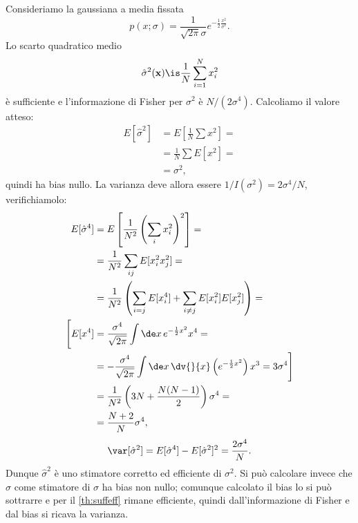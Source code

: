 \begin{example}
	Consideriamo la gaussiana a media fissata
	\begin{equation*}
		p(x;\sigma)
		= \frac1{\sqrt{2\pi}\sigma} e^{-\frac12 \frac{x^2}{\sigma^2}}.
	\end{equation*}
	Lo scarto quadratico medio
	\begin{equation*}
		\hat\sigma^2(\mathbf x)
		\is \frac1N \sum_{i=1}^N x_i^2
	\end{equation*}
	è sufficiente e l'informazione di Fisher per $\sigma^2$ è $N/(2\sigma^4)$.
	Calcoliamo il valore atteso:
	\begin{align*}
		E[\hat\sigma^2]
		&= E \left[ \frac 1N \sum x^2 \right] = \\
		&= \frac 1N \sum E[x^2] = \\
		&= \sigma^2,
	\end{align*}
	quindi ha bias nullo.
	La varianza deve allora essere $1/I(\sigma^2)=2\sigma^4/N$, verifichiamolo:
	\begin{align*}
		E[\hat\sigma^4]
		&= E \left[ \frac1{N^2}\left(\sum_ix_i^2\right)^2 \right] = \\
		&= \frac1{N^2} \sum_{ij} E[x_i^2x_j^2] = \\
		&= \frac1{N^2} \left( \sum_{i=j} E[x_i^4] + \sum_{i\neq j} E[x_i^2]E[x_j^2] \right) = \\
		\Bigg[ E[x^4]
		&= \frac{\sigma^4}{\sqrt{2\pi}} \int\de x\, e^{-\frac12 x^2} x^4 = \\
		&= - \frac{\sigma^4}{\sqrt{2\pi}} \int\de x\, \dv{}{x} \left(e^{-\frac12x^2}\right) x^3
		= 3 \sigma^4 \Bigg] \\
		&= \frac1{N^2} \left( 3N + \frac{N(N-1)}2 \right) \sigma^4 = \\
		&= \frac{N+2}N \sigma^4,
	\end{align*}
	\begin{equation*}
		\var[\hat\sigma^2]
		= E[\hat\sigma^4] - E[\hat\sigma^2]^2
		= \frac{2\sigma^4}N.
	\end{equation*}
	Dunque $\hat\sigma^2$ è uno stimatore corretto ed efficiente di $\sigma^2$.
	Si può calcolare invece che $\hat\sigma$ come stimatore di $\sigma$ ha bias non nullo;
	comunque calcolato il bias lo si può sottrarre e per il \autoref{th:suffeff} rimane efficiente,
	quindi dall'informazione di Fisher e dal bias si ricava la varianza.
\end{example}
